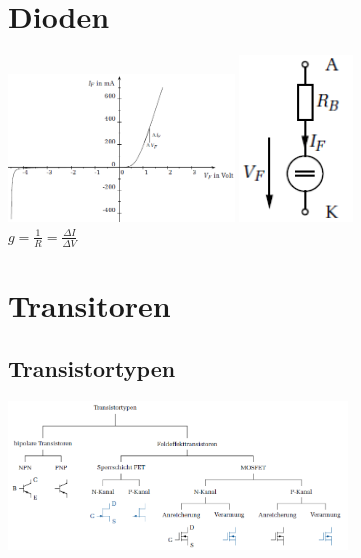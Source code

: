 
\begin{multicols}{2}
	\section{Dioden}
	\includegraphics[width=6cm]{images/DiodenKennlinie}
	\includegraphics[width=3cm]{images/DiodenKleinsignal}\\
	$g = \frac{1}{R}= \frac{\Delta I}{\Delta V}$
	\columnbreak
	
	\section{Transitoren}
		\subsection{Transistortypen}
		\includegraphics[width=9cm]{images/Transistortypen.png}
\end{multicols}

